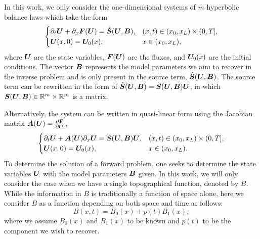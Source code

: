 In this work, we only consider the one-dimensional systems of $m$ hyperbolic balance laws which take the form
\begin{equation} \label{swe_balancelaw}
    \begin{cases}
    \partial_t \bm{U} + \partial_x \bm{F}(\bm{U}) = \hat{\bm{S}}(\bm{U},\bm{B}), & (x,t) \in (x_0,x_L) \times (0,T], \\
    \bm{U}(x,0) = \bm{U}_0(x), & x \in (x_0,x_L), \\
    \end{cases}
\end{equation}
where $\bm{U}$ are the state variables, $\bm{F}(\bm{U})$ are the fluxes, and $\bm{U}_0(x)$ are the initial conditions. The vector $\bm{B}$ represents the model parameters %
we aim to recover in the inverse problem and is only present in the source term, $\hat{\bm{S}}(\bm{U},\bm{B})$. %
The source term can be rewritten in the form of $\hat{\bm{S}}(\bm{U},\bm{B}) = \bm{S}(\bm{U},\bm{B})\bm{U}$, in which $\bm{S}(\bm{U},\bm{B}) \in \mathbb{R}^m \times \mathbb{R}^m$ is a matrix. 

Alternatively, the system can be written in quasi-linear form using the Jacobian matrix $\bm{A}(\bm{U})= \frac{\partial \bm{F}}{\partial \bm{U}}$,
\begin{equation}\label{swe_jacobiansys}
    \begin{cases}
    \partial_t \bm{U} + \bm{A}(\bm{U})\partial_x \bm{U} = \bm{S}(\bm{U},\bm{B})\bm{U},& (x,t) \in (x_0,x_L) \times (0,T], \\
    \bm{U}(x,0) = \bm{U}_0(x), & x \in (x_0,x_L). \\
    \end{cases}
\end{equation}
To determine the solution of a forward problem, one seeks to determine the state variables $\bm{U}$ with the model parameters $\bm{B}$ given. In this work, we will only consider the case when we have a single topographical function, denoted by $B$. While the information in $B$ is traditionally a function of space alone, here we consider $B$ as a function depending on both space and time as follows:
\begin{equation}\label{bottom}
    B(x,t) = B_0(x) + p(t)B_1(x),
\end{equation}
where we assume $B_0(x)$ and $B_1(x)$ to be known and $p(t)$ to be the component we wish to recover.

